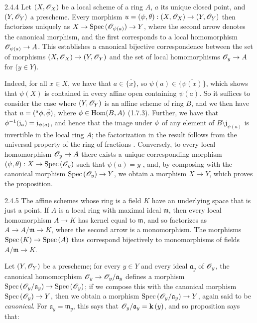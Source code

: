 \begin{envs}[Proposition]{2.4.4}
\label{prop-1.2.4.4}
Let $(X,\mathscr{O}_X)$ be a local scheme of a ring
$A$, $a$ its unique closed point, and $(Y,\mathscr{O}_Y)$ a prescheme.  Every morphism
$u=(\psi,\theta):(X,\mathscr{O}_X)\to(Y,\mathscr{O}_Y)$ then factorizes uniquely as
$X\to{\mathop{\mathrm{Spec}}\nolimits}\,(\mathscr{O}_{\psi(a)})\to Y$, where the second arrow denotes the canonical
morphism, and the first corresponds to a local homomorphism $\mathscr{O}_{\psi(a)}\to A$.
This establishes a canonical bijective correspondence between the set of
morphisms $(X,\mathscr{O}_X)\to(Y,\mathscr{O}_Y)$ and the set of local homomorphisms $\mathscr{O}_y\to A$
for ($y\in Y$).
\end{envs}
    
Indeed, for all $x\in X$, we have that $a\in\overline{\{x\}}$, so
$\psi(a)\in\overline{\{\psi(x)\}}$, which shows that $\psi(X)$ is contained in
every affine open containing $\psi(a)$. So it suffices to consider the case
where $(Y,\mathscr{O}_Y)$ is an affine scheme of ring $B$, and we then have that
$u=(^a\phi,\tilde{\phi})$, where $\phi\in{\mathop{\mathrm{Hom}}\nolimits}(B,A)$ (1.7.3).  Further,
we have that $\phi^{-1}(\mathfrak{j}_a)=\mathfrak{j}_{\psi(a)}$, and hence
that the image under $\phi$ of any element of
$B\setminus\mathfrak{j}_{\psi(a)}$ is invertible in the local ring $A$; the
factorization in the result follows from the universal property of the ring of
fractions . Conversely, to every local homomorphism
$\mathscr{O}_y\to A$ there exists a unique corresponding morphism
$(\psi,\theta):X\to{\mathop{\mathrm{Spec}}\nolimits}\,(\mathscr{O}_y)$ such that $\psi(a)=y$ , and,
by composing with the canonical morphism ${\mathop{\mathrm{Spec}}\nolimits}\,(\mathscr{O}_y)\to Y$, we obtain a morphism
$X\to Y$, which proves the proposition.
    
\begin{env}{2.4.5}
\label{env-1.2.4.5}
The affine schemes whose ring is a field $K$ have an
underlying space that is just a point. If $A$ is a local ring with maximal
ideal $\mathfrak{m}$, then every local homomorphism $A\to K$ has kernel equal to
$\mathfrak{m}$, and so factorizes as $A\to A/\mathfrak{m}\to K$, where the
second arrow is a monomorphism. The morphisms ${\mathop{\mathrm{Spec}}\nolimits}\,(K)\to{\mathop{\mathrm{Spec}}\nolimits}\,(A)$ thus
correspond bijectively to monomorphisms of fields $A/\mathfrak{m}\to K$.
\end{env}
    
Let $(Y,\mathscr{O}_Y)$ be a prescheme; for every $y\in Y$ and every ideal
$\mathfrak{a}_y$ of $\mathscr{O}_y$, the canonical homomorphism
$\mathscr{O}_y\to\mathscr{O}_y/\mathfrak{a}_y$ defines a morphism
${\mathop{\mathrm{Spec}}\nolimits}\,(\mathscr{O}_y/\mathfrak{a}_y)\to{\mathop{\mathrm{Spec}}\nolimits}\,(\mathscr{O}_y)$; if we compose this with the
canonical morphism ${\mathop{\mathrm{Spec}}\nolimits}\,(\mathscr{O}_y)\to Y$, then we obtain a morphism
${\mathop{\mathrm{Spec}}\nolimits}\,(\mathscr{O}_y/\mathfrak{a}_y)\to Y$, again said to be \textit{canonical}. For
$\mathfrak{a}_y=\mathfrak{m}_y$, this says that $\mathscr{O}_y/\mathfrak{a}_y=\mathbf{k}\,(y)$, and
so proposition  says that:
    
